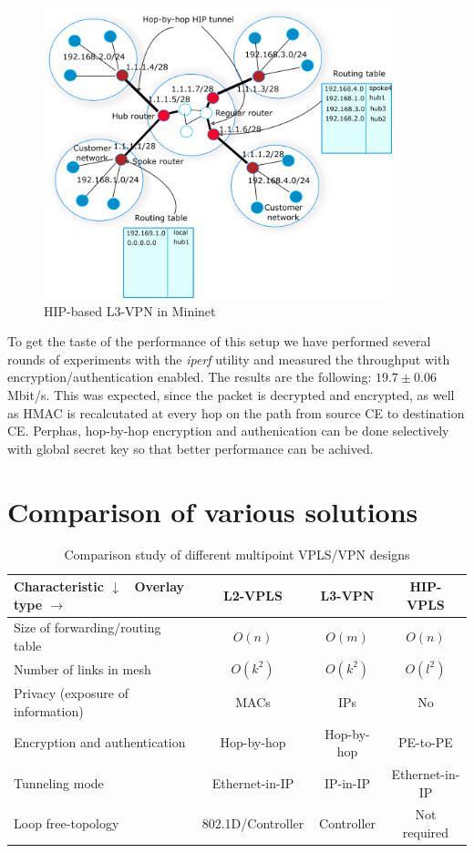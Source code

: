 \begin{figure}[!ht]
    \centering
    \includegraphics[width=0.9\textwidth]{graphics/l3-vpn.png}
    \caption{HIP-based L3-VPN in Mininet}
    \label{fig:l3vpn}
\end{figure}

To get the taste of the performance of this setup we have performed 
several rounds of experiments with the {\it iperf} utility and measured
the throughput with encryption/authentication enabled. The results 
are the following: $19.7 \pm 0.06$ Mbit/s. This was expected, since the packet
is decrypted and encrypted, as well as HMAC is recalcutated at every hop on 
the path from source CE to destination CE. Perphas, hop-by-hop encryption and authenication can
be done selectively with global secret key so that better performance can be achived.

\section{Comparison of various solutions}

\begin{table}
    \small
    \begin{tabular}{|l|c|c|c|}
    \hline
    Characteristic $\downarrow$ \ Overlay type $\rightarrow$ & L2-VPLS & L3-VPN & HIP-VPLS \\\hline
    Size of forwarding/routing table & $O(n)$ & $O(m)$ & $O(n)$\\\hline
    Number of links in mesh & $O(k^2)$ & $O(k^2)$ & $O(l^2)$ \\\hline
    Privacy (exposure of information) & MACs & IPs & No \\\hline
    Encryption and authentication & Hop-by-hop & Hop-by-hop & PE-to-PE \\\hline
    Tunneling mode & Ethernet-in-IP & IP-in-IP & Ethernet-in-IP \\\hline
    Loop free-topology & 802.1D/Controller & Controller & Not required \\\hline
    \end{tabular}
    \caption {Comparison study of different multipoint VPLS/VPN designs}
    \label{analysis}
\end{table}

